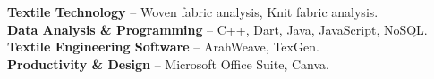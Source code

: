 

  
  \textbf{Textile Technology} – Woven fabric analysis, Knit fabric analysis. \\
  \vspace{1mm}
  \textbf{Data Analysis \& Programming} – C++, Dart, Java, JavaScript, NoSQL\@. \\
  \vspace{1mm}
  \textbf{Textile Engineering Software} – ArahWeave, TexGen. \\
  \vspace{1mm}
  \textbf{Productivity \& Design} – Microsoft Office Suite, Canva. 
